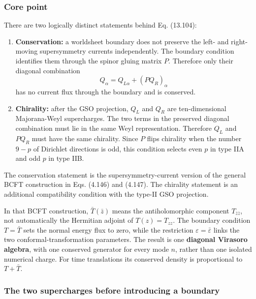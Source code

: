 \documentclass[
  10pt,
  a4paper,
  openany]{book}
\begin{document}
\subsubsection{Core point}\label{core-point-18}

There are two logically distinct statements behind Eq. (13.104):

\begin{enumerate}
\def\labelenumi{\arabic{enumi}.}
\item
  \textbf{Conservation:} a worldsheet boundary does not preserve the
  left- and right-moving supersymmetry currents independently. The
  boundary condition identifies them through the spinor gluing matrix
  \(P\). Therefore only their diagonal combination \[
  Q_\alpha
  =Q_{L\alpha}+(P Q_R)_\alpha
  \] has no current flux through the boundary and is conserved.
\item
  \textbf{Chirality:} after the GSO projection, \(Q_L\) and \(Q_R\) are
  ten-dimensional Majorana-Weyl supercharges. The two terms in the
  preserved diagonal combination must lie in the same Weyl
  representation. Therefore \(Q_L\) and \(P Q_R\) must have the same
  chirality. Since \(P\) flips chirality when the number \(9-p\) of
  Dirichlet directions is odd, this condition selects even \(p\) in type
  IIA and odd \(p\) in type IIB.
\end{enumerate}

The conservation statement is the supersymmetry-current version of the
general BCFT construction in Eqs. (4.146) and (4.147). The chirality
statement is an additional compatibility condition with the type-II GSO
projection.

In that BCFT construction, \(\bar T(\bar z)\) means the antiholomorphic
component \(T_{\bar z\bar z}\), not automatically the Hermitian adjoint
of \(T(z)=T_{zz}\). The boundary condition \(T=\bar T\) sets the normal
energy flux to zero, while the restriction
\(\varepsilon=\bar\varepsilon\) links the two conformal-transformation
parameters. The result is one \textbf{diagonal Virasoro algebra}, with
one conserved generator for every mode \(n\), rather than one isolated
numerical charge. For time translations its conserved density is
proportional to \(T+\bar T\).

\subsubsection{The two supercharges before introducing a
boundary}\label{the-two-supercharges-before-introducing-a-boundary}
\end{document}
